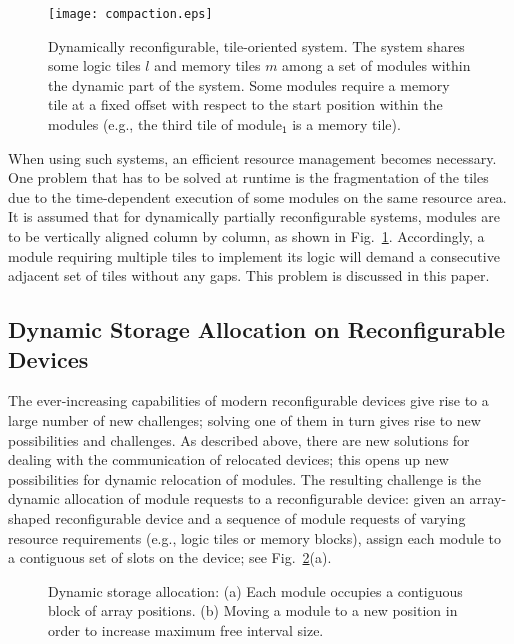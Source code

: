 \documentclass{article}
\begin{document}
\begin{figure}[h!]
\centering
\texttt{[image: compaction.eps]}
\caption{\label{fig:fpga_system}Dynamically reconfigurable, tile-oriented system.
The system shares some logic tiles $l$ and memory tiles $m$ among
a set of modules within the dynamic part of the system.
Some modules require a memory tile at a fixed offset with respect
to the start position within the modules
(e.g., the third tile of \textsf{module}$_\textsf{1}$ is a memory tile).
}
\end{figure}


When using such systems, an efficient resource management becomes necessary.
One problem that has to be solved at runtime is the fragmentation of the
tiles due to the time-dependent execution of some modules
on the same resource area.
It is assumed that for dynamically partially reconfigurable systems,
modules are to be vertically aligned column by column, as shown in
Fig.~\ref{fig:fpga_system}.
Accordingly, a module requiring multiple tiles to implement its logic 
will demand a consecutive adjacent set of tiles without any gaps.
This problem is discussed in this paper.

\subsection{Dynamic Storage Allocation on Reconfigurable Devices}
The ever-increasing capabilities of modern reconfigu\-rable devices
give rise to a large number of new challenges; solving one of them
in turn gives rise to new possibilities and challenges.
As described above, there are new solutions for dealing with
the communication of relocated devices; this opens up new
possibilities for dynamic relocation of modules.
The resulting challenge is the dynamic
allocation of module requests to a reconfigurable device:
given an array-shaped reconfigurable device and a sequence of module requests of
varying resource requirements (e.g., logic tiles or memory blocks), 
assign each module to a contiguous set of slots
on the device; see Fig.~\ref{storagealloc:fig}(a).

\begin{figure}[t]
  \centerline{}

\caption{Dynamic storage allocation:
(a) Each module occupies a contiguous block of array positions.
(b) Moving a module to a new position in order to increase maximum
free interval size.}\label{storagealloc:fig}

\end{figure}
\end{document}
